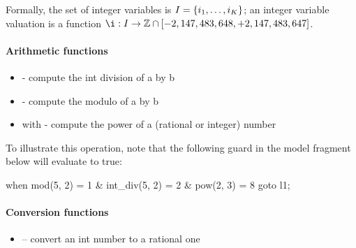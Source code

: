 Formally, the set of integer variables is $I = \{ i_1, \dots, i_K \} $;
an integer variable valuation is a function $\ival : \IVar \rightarrow \setZ \cap \left[-2,147,483,648, +2,147,483,647\right]$.



\paragraph{Arithmetic functions}

\begin{itemize}
	\item \label{item:lbl-int_div}  - compute the int division of a by b
\end{itemize}

\begin{itemize}
	\item \label{item:lbl-mod}  - compute the modulo of a by b
\end{itemize}

\begin{itemize}
    \item \label{item:lbl-pow}  with  - compute the power of a (rational or integer) number
\end{itemize}

\begin{example}
	To illustrate this operation, note that the following guard in the model fragment below will evaluate to true:

	\begin{IMITATORmodel}
		when mod(5, 2) = 1 & int_div(5, 2) = 2 & pow(2, 3) = 8 goto l1;
	\end{IMITATORmodel}
\end{example}

\paragraph{Conversion functions}

\begin{itemize}
    \item \label{item:lbl-rational_of_int}  -- convert an int number to a rational one
\end{itemize}

